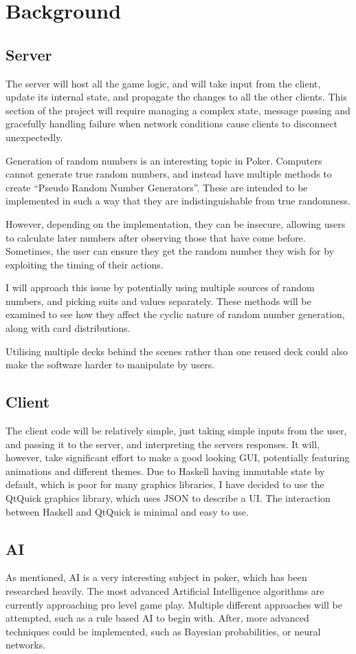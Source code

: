 \section{Background}
\subsection{Server}
The server will host all the game logic, and will take input from the client, update its internal state, and propagate the changes to all the other clients.
This section of the project will require managing a complex state, message passing and gracefully handling failure when network conditions cause clients to disconnect unexpectedly.

Generation of random numbers is an interesting topic in Poker. Computers cannot generate true random numbers, and instead have multiple methods to create ``Pseudo Random Number Generators''.
These are intended to be implemented in such a way that they are indistinguishable from true randomness.

However, depending on the implementation, they can be insecure, allowing users to calculate later numbers after observing those that have come before.
Sometimes, the user can ensure they get the random number they wish for by exploiting the timing of their actions.

I will approach this issue by potentially using multiple sources of random numbers, and picking suits and values separately. 
These methods will be examined to see how they affect the cyclic nature of random number generation, along with card distributions.

Utilising multiple decks behind the scenes rather than one reused deck could also make the software harder to manipulate by users.
\subsection{Client}
The client code will be relatively simple, just taking simple inputs from the user, and passing it to the server, and interpreting the servers responses.
It will, however, take significant effort to make a good looking GUI, potentially featuring animations and different themes.
Due to Haskell having immutable state by default, which is poor for many graphics libraries, I have decided to use the QtQuick graphics library, which uses JSON to describe a UI\@.
The interaction between Haskell and QtQuick is minimal and easy to use.
\subsection{AI}
As mentioned, AI is a very interesting subject in poker, which has been researched heavily. 
The most advanced Artificial Intelligence algorithms are currently approaching pro level game play.
Multiple different approaches will be attempted, such as a rule based AI\cite{watson2008} to begin with.
After, more advanced techniques could be implemented, such as Bayesian probabilities\cite{billings2002}, or neural networks\cite{teofilo2011}.

